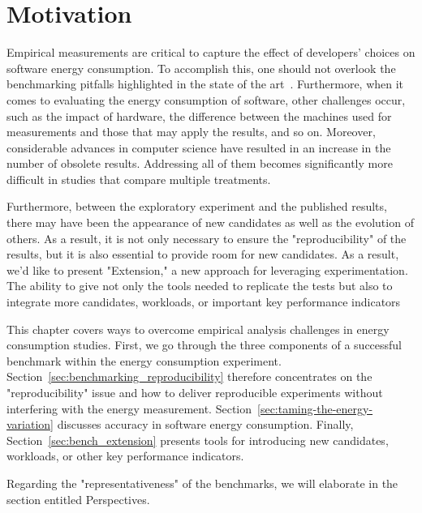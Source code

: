 
\section{Motivation}
Empirical measurements are critical to capture the effect of developers' choices on software energy consumption.
To accomplish this, one should not overlook the benchmarking pitfalls highlighted in the state of the art~\cite{van_der_kouwe_benchmarking_2018}.
Furthermore, when it comes to evaluating the energy consumption of software, other challenges occur, such as the impact of hardware, the difference between the machines used for measurements and those that may apply the results, and so on.
Moreover, considerable advances in computer science have resulted in an increase in the number of obsolete results.
Addressing all of them becomes significantly more difficult in studies that compare multiple treatments.

Furthermore, between the exploratory experiment and the published results, there may have been the appearance of new candidates as well as the evolution of others.
As a result, it is not only necessary to ensure the "reproducibility" of the results, but it is also essential to provide room for new candidates.
As a result, we'd like to present "Extension," a new approach for leveraging experimentation.
The ability to give not only the tools needed to replicate the tests but also to integrate more candidates, workloads, or important key performance indicators

This chapter covers ways to overcome empirical analysis challenges in energy consumption studies. First, we  go through the three components of a successful benchmark within the energy consumption experiment. Section~\ref{sec:benchmarking_reproducibility}  therefore concentrates on the "reproducibility" issue and how to deliver reproducible experiments without interfering with the energy measurement. Section~\ref{sec:taming-the-energy-variation}  discusses accuracy in software energy consumption. 
Finally, Section~\ref{sec:bench_extension} presents tools for introducing new candidates, workloads, or other key performance indicators.



Regarding the "representativeness" of the benchmarks, we will elaborate in the section entitled Perspectives.




